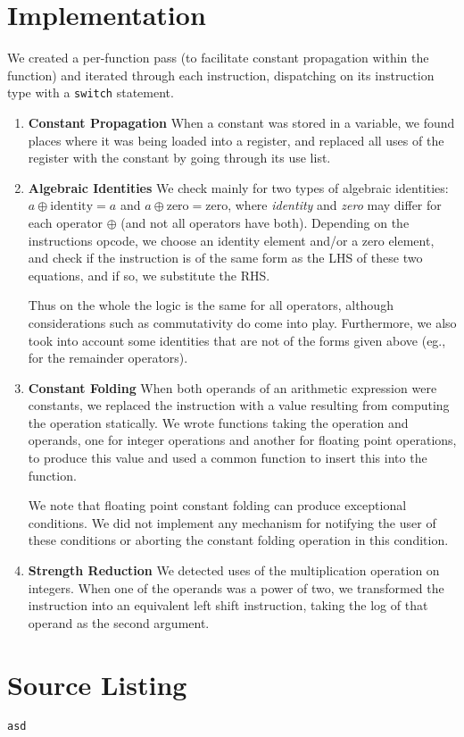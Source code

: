\documentclass[12pt]{article}
\begin{document}
\section{Implementation}
We created a per-function pass (to facilitate constant propagation within the function) and iterated through each instruction, dispatching on its instruction type with a \texttt{switch} statement.
\begin{enumerate}
\item \textbf{Constant Propagation} When a constant was stored in a variable, we found places where it was being loaded into a register, and replaced all uses of the register with the constant by going through its use list. 
\item \textbf{Algebraic Identities} We check mainly for two types of algebraic identities: $a \oplus \text{identity} = a$ and $a \oplus \text{zero} = \text{zero}$, where \emph{identity} and \emph{zero} may differ for each operator $\oplus$ (and not all operators have both). Depending on the instructions opcode, we choose an identity element and/or a zero element, and check if the instruction is of the same form as the LHS of these two equations, and if so, we substitute the RHS. 

Thus on the whole the logic is the same for all operators, although considerations such as commutativity do come into play. Furthermore, we also took into account some identities that are not of the forms given above (eg., for the remainder operators).
\item \textbf{Constant Folding} When both operands of an arithmetic expression were constants, we replaced the instruction with a value resulting from computing the operation statically. We wrote  functions taking the operation and operands, one for integer operations and another for floating point operations, to produce this value and used a common function to insert this into the function.

We note that floating point constant folding can produce exceptional conditions. We did not implement any mechanism for notifying the user of these conditions or aborting the constant folding operation in this condition.
\item \textbf{Strength Reduction} We detected uses of the multiplication operation on integers. When one of the operands was a power of two, we transformed the instruction into an equivalent left shift instruction, taking the log of that operand as the second argument.
\end{enumerate}
\section{Source Listing}
\begin{verbatim}
asd
\end{verbatim}
\end{document}
